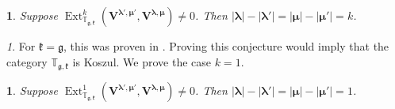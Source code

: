 \documentclass[12pt,oneside,english]{amsart}
\numberwithin{equation}{section}
\numberwithin{figure}{section}
\theoremstyle{plain}
\theoremstyle{plain}
\theoremstyle{remark}
\newtheorem{rem}[thm]{\protect\remarkname}
\theoremstyle{definition}
\theoremstyle{plain}
\newtheorem{conjecture}[thm]{\protect\conjecturename}
\theoremstyle{remark}
\theoremstyle{definition}
\theoremstyle{plain}
\theoremstyle{plain}
\newtheorem{prop}[thm]{\protect\propositionname}
\theoremstyle{definition}
\providecommand{\conjecturename}{Conjecture}
\providecommand{\propositionname}{Proposition}
\providecommand{\remarkname}{Remark}
\newcommand{\bV}{\mathbf{V}}
\newcommand{\fg}{\mathfrak{g}}
\newcommand{\fk}{\mathfrak{k}}
\begin{document}
  \begin{conjecture}\label{lem:ext} Suppose $\operatorname{Ext}^k_{\mathbb T_{\fg,\fk}}(\bV^{\boldsymbol{\lambda}',{\boldsymbol{\mu}}'},\bV^{\boldsymbol{\lambda},{\boldsymbol{\mu}}})\neq 0$. Then $|\boldsymbol{\lambda}|-|\boldsymbol{\lambda}'|=|{\boldsymbol{\mu}}|-|{\boldsymbol{\mu}}'|=k$.
    \end{conjecture}

\begin{rem} For $\fk=\fg$, this was proven in \cite{DPS}. Proving this conjecture would imply that the category $ \mathbb T_{\fg,\fk}$ is Koszul. We prove the case $k=1$. \end{rem}



    \begin{prop}\label{lem:ext} Suppose $\operatorname{Ext}^1_{\mathbb T_{\fg,\fk}}(\bV^{\boldsymbol{\lambda}',{\boldsymbol{\mu}}'},\bV^{\boldsymbol{\lambda},{\boldsymbol{\mu}}})\neq 0$. Then $|\boldsymbol{\lambda}|-|\boldsymbol{\lambda}'|=|{\boldsymbol{\mu}}|-|{\boldsymbol{\mu}}'|=1$.
    \end{prop}
\end{document}
